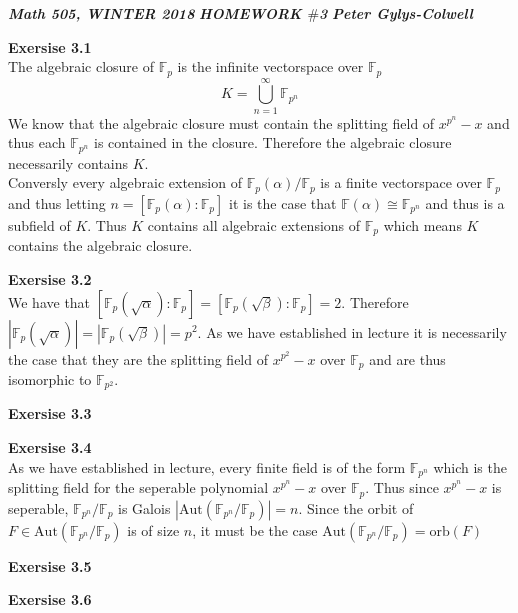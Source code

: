 \documentclass[12pt]{article}
\newenvironment{ques}[1]{\textbf{Exersise #1}\vspace{1 mm}\\ }{\bigskip}
\theoremstyle{definition}
\newcommand{\F}{\mathbb F}
\renewcommand{\a}{\alpha}
\renewcommand{\b}{\beta}
\newcommand{\Aut}{\text{Aut}}
\begin{document}
\noindent \textit{\textbf{Math 505, WINTER 2018}} \hspace{1.3cm}
\textit{\textbf{HOMEWORK $\#$3}} \hspace{1.3cm} \textit{\textbf{Peter
Gylys-Colwell}} 

\vspace{1cm}

\begin{ques}{3.1}
	The algebraic closure of $\F_p$ is the infinite vectorspace over $\F_p$
	$$K = \bigcup_{n=1}^\infty \F_{p^n}$$
	We know that the algebraic closure must contain the splitting field of
	$x^{p^n} - x$ and thus each $\F_{p^n}$ is contained in the closure.
	Therefore the algebraic closure necessarily contains $K$. \\
	Conversly every algebraic extension of $\F_p(\alpha)/\F_p$ is a finite
	vectorspace over $\F_p$ and thus letting $n = [\F_p(\a):\F_p]$ it is the
	case that $\F(\a) \cong \F_{p^{n}}$ and thus is a subfield of $K$. Thus $K$
	contains all algebraic extensions of $\F_p$ which means $K$ contains the
	algebraic closure.
\end{ques}

\begin{ques}{3.2}
	We have that $[\F_p(\sqrt \a):\F_p] = [\F_p(\sqrt \b):\F_p] = 2$. Therefore
	$|\F_p(\sqrt \a)| = |\F_p(\sqrt \b)| = p^2$. As we have established in
	lecture it is necessarily the case that they are the splitting field of
	$x^{p^2} - x$ over $\F_p$ and are thus isomorphic to $\F_{p^2}$.
\end{ques}

\begin{ques}{3.3}
	
\end{ques}

\begin{ques}{3.4}
	As we have established in lecture, every finite field is of the form
	$\F_{p^n}$ which is the splitting field for the seperable polynomial
	$x^{p^n}-x$ over $\F_p$. Thus since $x^{p^n}-x$ is seperable,
	$\F_{p^n}/\F_p$ is Galois $|\Aut(\F_{p^n}/\F_p)| = n$. Since the orbit of
	$F \in \Aut(\F_{p^n}/\F_p)$ is of size $n$, it must be the case
	$\Aut(\F_{p^n}/\F_p) = \text{orb}(F)$
\end{ques}

\begin{ques}{3.5}
\end{ques}

\begin{ques}{3.6}
\end{ques}
\end{document}
